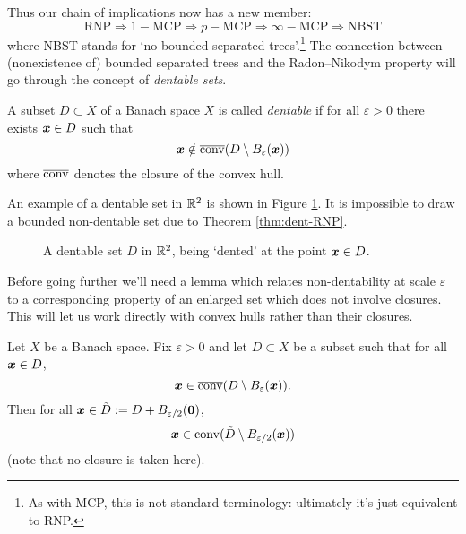 Thus our chain of implications now has a new member:
\begin{equation*}
  \mathrm{RNP} \Longrightarrow 1-\mathrm{MCP} \Longrightarrow p-\mathrm{MCP} \Longrightarrow \infty-\mathrm{MCP}
  \Longrightarrow \mathrm{NBST}
\end{equation*}
where NBST stands for `no bounded separated trees'.\footnote{As with MCP, this is not standard terminology: ultimately it's just equivalent to RNP.}
The connection between (nonexistence of) bounded separated trees and the Radon--Nikodym property will go through the concept of \emph{dentable sets}.

\begin{defn}
  A subset $D \subset X$ of a Banach space $X$ is called \emph{dentable} if for all $\varepsilon > 0$ there exists $\bm{x} \in D$ such that
  \begin{equation*}
    \bm{x} \notin \overline{\mathrm{conv}}(D \setminus B_{\varepsilon}(\bm{x}))
  \end{equation*}
  where $\overline{\mathrm{conv}}$ denotes the closure of the convex hull.
\end{defn}

An example of a dentable set in $\mathbb{R}^{2}$ is shown in Figure \ref{fig:dentable}.
It is impossible to draw a bounded non-dentable set due to Theorem \ref{thm:dent-RNP}. 

\begin{figure}
    \centering
    \def\svgwidth{\columnwidth}
    
    
    \caption{A dentable set $D$ in $\mathbb{R}^{2}$, being `dented' at the point $\bm{x} \in D$.}
    \label{fig:dentable}
\end{figure}

Before going further we'll need a lemma which relates non-dentability at scale $\varepsilon$ to a corresponding property of an enlarged set which does not involve closures.
This will let us work directly with convex hulls rather than their closures.

\begin{lem}\label{lem:dentlem}
  Let $X$ be a Banach space.
  Fix $\varepsilon > 0$ and let $D \subset X$ be a subset such that for all $\bm{x} \in D$,
  \begin{equation}\label{eq:dentlem-ass}
    \bm{x} \in \overline{\mathrm{conv}}(D \setminus B_{\varepsilon}(\bm{x})).
  \end{equation}
  Then for all $\bm{x} \in \tilde{D} := D + B_{\varepsilon/2}(\bm{0})$,
  \begin{equation}
    \bm{x} \in \mathrm{conv}(\tilde{D} \setminus B_{\varepsilon/2}(\bm{x}))
  \end{equation}
  (note that no closure is taken here).
\end{lem}

